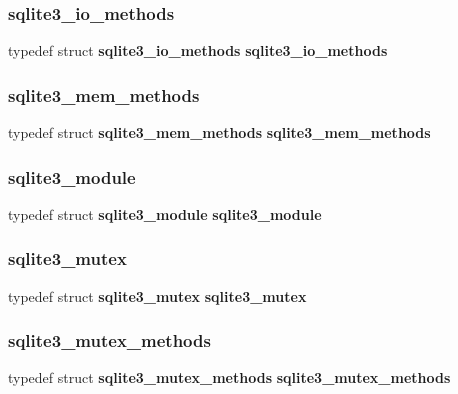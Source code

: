 \subsubsection{sqlite3\_io\_methods}
{\footnotesize\ttfamily typedef struct \textbf{ sqlite3\+\_\+io\+\_\+methods} \textbf{ sqlite3\+\_\+io\+\_\+methods}}

\mbox{\label{sqlite3_8h_a2c24ec48f946d709201c12948a008a26}} 
\subsubsection{sqlite3\_mem\_methods}
{\footnotesize\ttfamily typedef struct \textbf{ sqlite3\+\_\+mem\+\_\+methods} \textbf{ sqlite3\+\_\+mem\+\_\+methods}}

\mbox{\label{sqlite3_8h_a2a3d7c1acb4eed3eee8a22b8ebcf66b9}} 
\subsubsection{sqlite3\_module}
{\footnotesize\ttfamily typedef struct \textbf{ sqlite3\+\_\+module} \textbf{ sqlite3\+\_\+module}}

\mbox{\label{sqlite3_8h_a0f546860bde03fddb33a9fed920da05c}} 
\subsubsection{sqlite3\_mutex}
{\footnotesize\ttfamily typedef struct \textbf{ sqlite3\+\_\+mutex} \textbf{ sqlite3\+\_\+mutex}}

\mbox{\label{sqlite3_8h_a2d2297c024ea736635619e004e231c27}} 
\subsubsection{sqlite3\_mutex\_methods}
{\footnotesize\ttfamily typedef struct \textbf{ sqlite3\+\_\+mutex\+\_\+methods} \textbf{ sqlite3\+\_\+mutex\+\_\+methods}}

\mbox{\label{sqlite3_8h_a096c453d937d51f7926d7d31c8e0bd2f}} 
